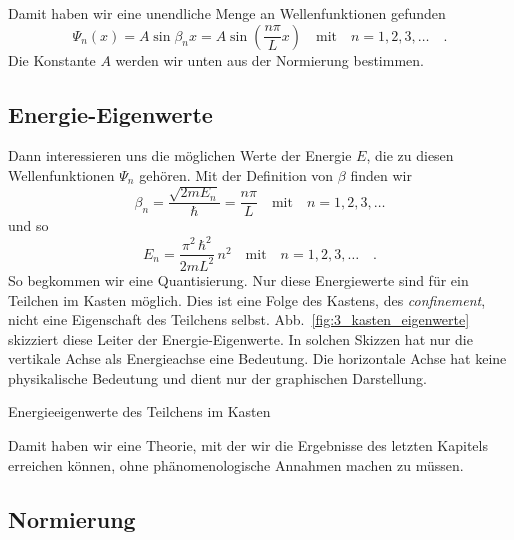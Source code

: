 Damit haben wir eine unendliche Menge an   Wellenfunktionen gefunden
\begin{equation}
    \Psi_n(x) = A \sin \beta_n x = A \sin \left(  \frac{n\pi}{L} x \right) \quad \text{mit} \quad n = 1, 2, 3, \dots \quad .
\end{equation}
Die Konstante $A$ werden wir unten aus der Normierung bestimmen.



\subsection{Energie-Eigenwerte}

Dann interessieren uns die möglichen Werte der Energie $E$, die zu diesen Wellenfunktionen $\Psi_n$ gehören. Mit der Definition von $\beta$ finden wir
\begin{equation}
    \beta_n = \frac{\sqrt{ 2 m E_n}}{\hbar} = \frac{n\pi}{L} \quad \text{mit} \quad n = 1, 2, 3, \dots
\end{equation}
und so 
\begin{equation}
    E_n = \frac{\pi^2 \, \hbar^2}{2 m L^2} \, n^2 \quad \text{mit} \quad n = 1, 2, 3, \dots \quad .
    \label{eq:3_En_kasten}
\end{equation}
So begkommen wir eine Quantisierung. Nur diese Energiewerte sind für ein Teilchen im Kasten möglich. Dies ist eine Folge des Kastens, des \textit{confinement}, nicht eine Eigenschaft des Teilchens selbst.  Abb.~\ref{fig:3_kasten_eigenwerte} skizziert diese Leiter der Energie-Eigenwerte. In solchen Skizzen hat nur die vertikale Achse als Energieachse eine Bedeutung. Die horizontale Achse hat keine physikalische Bedeutung und dient nur der graphischen Darstellung.

\begin{marginfigure}
    \caption{Energieeigenwerte des Teilchens im Kasten}
    \label{fig:3_kasten_eigenwerte}
\end{marginfigure}

Damit haben wir eine Theorie, mit der wir die Ergebnisse des letzten Kapitels erreichen können, ohne phänomenologische Annahmen machen zu müssen.


\subsection{Normierung}

